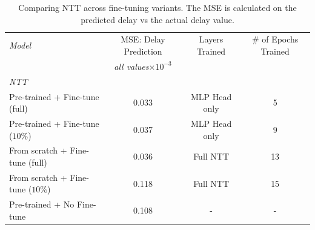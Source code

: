 \begin{table}[htbp]
\centering
\begin{tabular}{ l   c   c  c }
\toprule
\emph{Model} &  MSE: Delay Prediction    & Layers Trained  & 	\# of Epochs Trained\\
			&		\emph{all values$\times10^{-3}$} 	&   	& \\ 
			

\midrule
\em{NTT}                                                               &                                             &   &  \\
    \smallindent Pre-trained  +   Fine-tune (full)                                  & 0.033                             & MLP Head only        & 5\\
    \smallindent Pre-trained  +   Fine-tune ($10\%$)                                  & 0.037                             & MLP Head only         & 9\\
    \smallindent From scratch  + Fine-tune (full)                                       & 0.036                             & Full NTT     & 13\\
     \smallindent From scratch  + Fine-tune ($10\%$)                                    & 0.118                             & Full NTT      &  15 \\
     \smallindent Pre-trained  +   No Fine-tune                                  & 0.108                             & -          & -\\
 
 \bottomrule

\end{tabular}
\caption{Comparing NTT across fine-tuning variants. The MSE is calculated on the predicted delay vs the actual delay value.}
\label{eval:table3}
\end{table}

